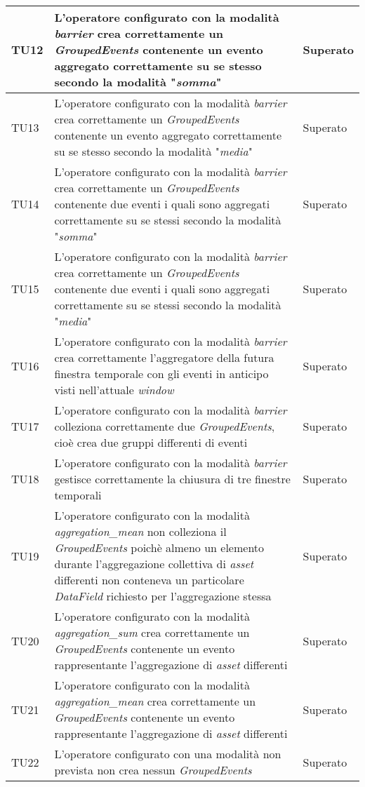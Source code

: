 {\begin{longtable}{L{3cm} L{8.5cm} L{2cm}}
\hline
TU12 & L'operatore configurato con la modalità \textit{barrier} crea correttamente un \textit{GroupedEvents} contenente un evento aggregato correttamente su se stesso secondo la modalità "\textit{somma}" & Superato \\
\hline
TU13 & L'operatore configurato con la modalità \textit{barrier} crea correttamente un \textit{GroupedEvents} contenente un evento aggregato correttamente su se stesso secondo la modalità "\textit{media}" & Superato \\
\hline
TU14 & L'operatore configurato con la modalità \textit{barrier} crea correttamente un \textit{GroupedEvents} contenente due eventi i quali sono aggregati correttamente su se stessi secondo la modalità "\textit{somma}" & Superato \\
\hline
TU15 & L'operatore configurato con la modalità \textit{barrier} crea correttamente un \textit{GroupedEvents} contenente due eventi i quali sono aggregati correttamente su se stessi secondo la modalità "\textit{media}" & Superato \\
\hline
TU16 & L'operatore configurato con la modalità \textit{barrier} crea correttamente l'aggregatore della futura finestra temporale con gli eventi in anticipo visti nell'attuale \textit{window} & Superato \\
\hline
TU17 & L'operatore configurato con la modalità \textit{barrier} colleziona correttamente due \textit{GroupedEvents}, cioè crea due gruppi differenti di eventi & Superato \\
\hline
TU18 & L'operatore configurato con la modalità \textit{barrier} gestisce correttamente la chiusura di tre finestre temporali & Superato \\
\hline
TU19 & L'operatore configurato con la modalità \textit{aggregation\_mean} non colleziona il \textit{GroupedEvents} poichè almeno un elemento durante l'aggregazione collettiva di \textit{asset} differenti non conteneva un particolare \textit{DataField} richiesto per l'aggregazione stessa & Superato \\
\hline
TU20 & L'operatore configurato con la modalità \textit{aggregation\_sum} crea correttamente un \textit{GroupedEvents} contenente un evento rappresentante l'aggregazione di \textit{asset} differenti & Superato \\
\hline
TU21 & L'operatore configurato con la modalità \textit{aggregation\_mean} crea correttamente un \textit{GroupedEvents} contenente un evento rappresentante l'aggregazione di \textit{asset} differenti & Superato \\
\hline
TU22 & L'operatore configurato con una modalità non prevista non crea nessun \textit{GroupedEvents} & Superato \\
\hline
\end{longtable}
}



